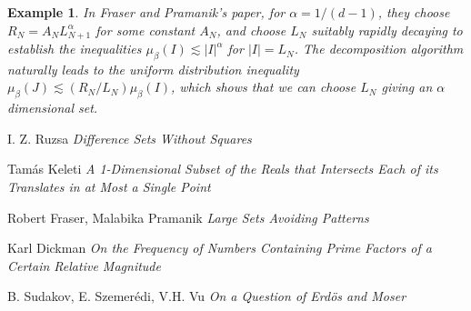 \documentclass{report}
\theoremstyle{plain}
\newtheorem*{example}{Example}
\theoremstyle{plain}
\begin{document}
\begin{example}
    In Fraser and Pramanik's paper, for $\alpha = 1/(d-1)$, they choose $R_N = A_N L_{N+1}^\alpha$ for some constant $A_N$, and choose $L_N$ suitably rapidly decaying to establish the inequalities $\mu_\beta(I) \lesssim |I|^\alpha$ for $|I| = L_N$. The decomposition algorithm naturally leads to the uniform distribution inequality $\mu_\beta(J) \lesssim (R_N/L_N) \mu_\beta(I)$, which shows that we can choose $L_N$ giving an $\alpha$ dimensional set.
\end{example}


\begin{thebibliography}{9}

I. Z. Ruzsa
\textit{Difference Sets Without Squares}

Tam\'{a}s Keleti
\textit{A 1-Dimensional Subset of the Reals that Intersects Each of its Translates in at Most a Single Point}

Robert Fraser, Malabika Pramanik
\textit{Large Sets Avoiding Patterns}

Karl Dickman
\textit{On the Frequency of Numbers Containing Prime Factors of a Certain Relative Magnitude}

B. Sudakov, E. Szemer\'{e}di, V.H. Vu
\textit{On a Question of Erd\"{o}s and Moser}

\end{thebibliography}
\end{document}
